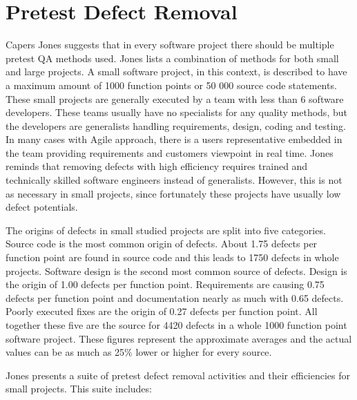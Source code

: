  \section{Pretest Defect Removal}
\label{sec:pretest}

Capers Jones suggests that in every software project there should be multiple pretest QA methods used. Jones lists a combination of methods for both small and large projects. A small software project, in this context, is described to have a maximum amount of 1000 function points or 50 000 source code statements. These small projects are generally executed by a team with less than 6 software developers. These teams usually have no specialists for any quality methods, but the developers are generalists handling requirements, design, coding and testing. In many cases with Agile approach, there is a users representative embedded in the team providing requirements and customers viewpoint in real time. Jones reminds that removing defects with high efficiency requires trained and technically skilled software engineers instead of generalists. However, this is not as necessary in small projects, since fortunately these projects have usually low defect potentials.


The origins of defects in small studied projects are split into five categories. Source code is the most common origin of defects. About 1.75 defects per function point are found in source code and this leads to 1750 defects in whole projects. Software design is the second most common source of defects. Design is the origin of 1.00 defects per function point. Requirements are causing 0.75 defects per function point and documentation nearly as much with 0.65 defects. Poorly executed fixes are the origin of 0.27 defects per function point. All together these five are the source for 4420 defects in a whole 1000 function point software project. These figures represent the approximate averages and the actual values can be as much as 25\% lower or higher for every source. 


Jones presents a suite of pretest defect removal activities and their efficiencies for small projects. This suite includes:

